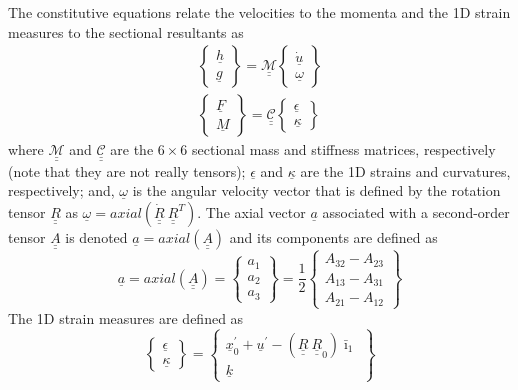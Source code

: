 \documentclass{aiaa-tc}
\newcommand{\tens}[1]{\underline{\underline{#1}}}
\renewcommand{\vec}[1]{\underline{#1}}
\begin{document}
The constitutive equations relate the velocities to the momenta and the 1D strain measures to the sectional resultants as
\begin{align}
	\label{ConstitutiveMass}
	\begin{Bmatrix}
	\underline{h} \\
	\underline{g}
	\end{Bmatrix}
	= \underline{\underline{\mathcal{M}}} \begin{Bmatrix}
	\dot{\underline{u}} \\
	\underline{\omega}
	\end{Bmatrix} \\
	\label{ConstitutiveStiff}
	\begin{Bmatrix}
	\underline{F} \\
	\underline{M}
	\end{Bmatrix}
	= \underline{\underline{\mathcal{C}}} \begin{Bmatrix}
	\underline{\epsilon} \\
	\underline{\kappa}
	\end{Bmatrix}
\end{align}
where $\underline{\underline{\mathcal{M}}}$ and
$\underline{\underline{\mathcal{C}}}$ are the $6 \times 6$ sectional mass
and stiffness matrices, respectively (note that they are not really tensors);
$\underline{\epsilon}$ and $\underline{\kappa}$ are the 1D strains and
curvatures, respectively; and, $\underline{\omega}$ is the angular velocity
vector that is defined by the rotation tensor $\underline{\underline{R}}$ as
$\underline{\omega} =
axial(\dot{\underline{\underline{R}}}~\underline{\underline{R}}^T)$. The axial vector $\vec{a}$ associated with a second-order tensor $\tens{A}$ is denoted $\vec{a}=axial(\tens{A})$ and its components are defined as
\begin{equation}
    \label{axial}
    \vec{a} = axial(\tens{A})=\begin{Bmatrix}
    a_1 \\
    a_2 \\
    a_3
    \end{Bmatrix}
    =\frac{1}{2}
    \begin{Bmatrix}
    A_{32}-A_{23} \\
    A_{13}-A_{31} \\
    A_{21}-A_{12}
    \end{Bmatrix}
\end{equation}
The 1D strain measures are defined as
\begin{equation}
    \label{1DStrain}
    \begin{Bmatrix}
        \vec{\epsilon} \\
        \vec{\kappa}
    \end{Bmatrix}
    =
    \begin{Bmatrix}
        \vec{x}^\prime_0 + \vec{u}^\prime - (\tens{R} ~\tens{R}_0) \bar{\imath}_1 \\
        \vec{k}
    \end{Bmatrix}
\end{equation}
\end{document}
